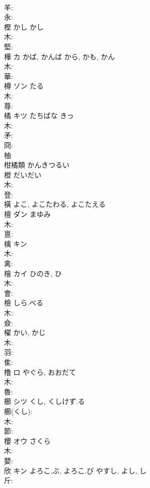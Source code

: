 \documentclass[8pt]{extreport}
\begin{document}
\begin{CJK}{UTF8}{min}
\\	羊: 
\\	永: 
\\	樫	かし	かし		
\\	木: 
\\	堅: 
\\	樺	カ	かば, かんば	から, かも, かん	
\\	木: 
\\	華: 
\\	樽	ソン	たる		
\\	木: 
\\	尊: 
\\	橘	キツ	たちばな	きっ	
\\	木: 
\\	矛: 
\\	冏: 
\\	柚 
\\	柑橘類 かんきつるい 
\\	橙		だいだい				
\\	木: 
\\	登: 
\\	橫		よこ, よこたわる, よこたえる				
\\	檀	ダン	まゆみ		
\\	木: 
\\	亶: 
\\	檎	キン			
\\	木: 
\\	禽: 
\\	檜	カイ	ひのき, ひ		
\\	木: 
\\	會: 
\\	檢		しら.べる				
\\	木: 
\\	僉: 
\\	櫂		かい, かじ				
\\	木: 
\\	羽: 
\\	隹: 
\\	櫓	ロ	やぐら, おおだて		
\\	木: 
\\	魯: 
\\	櫛	シツ	くし, くしけず.る		
\\	櫛(くし): 
\\	木: 
\\	節: 
\\	櫻	オウ	さくら		
\\	木: 
\\	嬰: 
\\	欣	キン	よろこ.ぶ, よろこ.び	やすし, よし, し	
\\	斤: 

\end{CJK}
\end{document}
